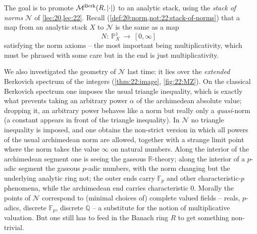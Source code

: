 The goal is to promote $\mathcal{M}^{\mathrm{Berk}}(R,\lvert\cdot\rvert)$ to an analytic stack, using
the \emph{stack of norms} $\mathcal N$ of \cref{lec:20,lec:22}. Recall
(\cref{def:20:norm,not:22:stack-of-norms}) that a map from an analytic stack
$X$ to $\mathcal N$ is the same as a map
\begin{equation*}
N\colon\ \mathbb P^1_X\ \longrightarrow\ [0,\infty]
\end{equation*}
satisfying the norm axioms -- the most important being multiplicativity, which
must be phrased with some care but in the end is just multiplicativity.

We also investigated the geometry of $\mathcal N$ last time: it lies over the
\emph{extended} Berkovich spectrum of the integers (\cref{thm:22:image},
\cref{fig:22:MZ}). On the classical Berkovich spectrum one imposes the usual
triangle inequality, which is exactly what prevents taking an arbitrary power
$\alpha$ of the archimedean absolute value; dropping it, an arbitrary power
behaves like a norm but really only a \emph{quasi}-norm (a constant appears in
front of the triangle inequality). In $\mathcal N$ no triangle inequality is
imposed, and one obtains the non-strict version in which all powers of the usual
archimedean norm are allowed, together with a strange limit point where the norm
takes the value $\infty$ on natural numbers. Along the interior of the
archimedean segment one is seeing the gaseous $\mathbb R$-theory; along the
interior of a $p$-adic segment the gaseous $p$-adic numbers, with the norm
changing but the underlying analytic ring not; the outer ends carry
$\mathbb F_p$ and other characteristic-$p$ phenomena, while the archimedean end
carries characteristic $0$. Morally the points of $\mathcal N$ correspond to
(minimal choices of) complete valued fields -- reals, $p$-adics, discrete
$\mathbb F_p$, discrete $\mathbb Q$ -- a substitute for the notion of
multiplicative valuation. But one still has to feed in the Banach ring $R$ to
get something non-trivial.

